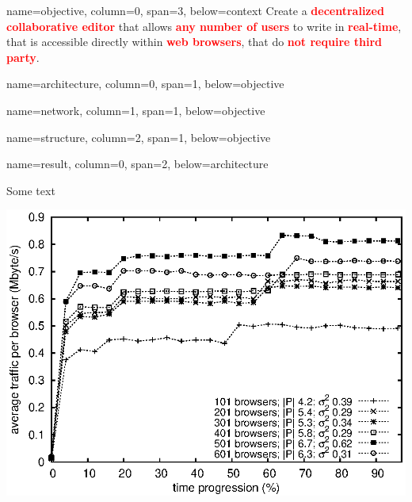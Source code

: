 \documentclass[a1paper, fontscale=0.35, portrait]{baposter}
\newcommand{\BOLD}[1]{\textcolor{red}{\textbf{#1}}}
\begin{document}
\begin{poster}
  
  {name=objective, column=0, span=3, below=context} {
    Create a \BOLD{decentralized collaborative editor} that allows \BOLD{any number
      of users} to write in \BOLD{real-time}, that is accessible directly within
    \BOLD{web browsers}, that do \BOLD{not require third party}.
  }

  {name=architecture, column=0, span=1, below=objective}{
    \begin{center}
      
    \end{center}
  }
  
  {name=network, column=1, span=1, below=objective}{
    \begin{center}
      
    \end{center}
  }

  {name=structure, column=2, span=1, below=objective}{
    \begin{center}
      
    \end{center}
  }

  {name=result, column=0, span=2, below=architecture}{
    \begin{minipage}[c]{.5\linewidth}
      Some text
    \end{minipage} \hfill
    \begin{minipage}[c]{.5\linewidth}
      \centering
      \includegraphics[scale=0.5]{img/traffic.eps}
    \end{minipage}

}
\end{poster}
\end{document}
